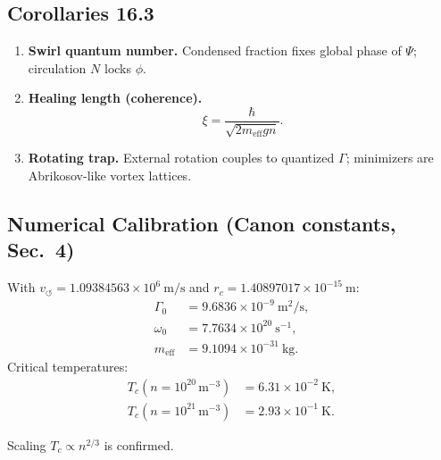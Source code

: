 \documentclass[11pt]{article}
\begin{document}
        \subsection*{Corollaries 16.3}
            \begin{enumerate}
            \item \textbf{Swirl quantum number.}
            Condensed fraction fixes global phase of $\Psi$; circulation $N$ locks $\phi$.

            \item \textbf{Healing length (coherence).}
            \begin{equation}
            \xi = \frac{\hbar}{\sqrt{2 m_{\text{eff}} g n}} .
            \end{equation}

            \item \textbf{Rotating trap.}
            External rotation couples to quantized $\Gamma$; minimizers are Abrikosov-like vortex lattices.
            \end{enumerate}

        \subsection*{Numerical Calibration (Canon constants, Sec.~4)}
            With $v_\circlearrowleft = 1.09384563\times 10^6~\text{m/s}$
            and $r_c = 1.40897017\times 10^{-15}~\text{m}$:
            \begin{align}
            \Gamma_0 &= 9.6836\times10^{-9}\ \text{m}^2/\text{s}, \\
            \omega_0 &= 7.7634\times10^{20}\ \text{s}^{-1}, \\
            m_{\text{eff}} &= 9.1094\times10^{-31}\ \text{kg}.
            \end{align}
            Critical temperatures:
            \begin{align}
            T_c(n=10^{20}\,\text{m}^{-3}) &= 6.31\times10^{-2}\ \text{K}, \\
            T_c(n=10^{21}\,\text{m}^{-3}) &= 2.93\times10^{-1}\ \text{K}.
            \end{align}

            \noindent Scaling $T_c \propto n^{2/3}$ is confirmed. \checkmark

\end{document}
